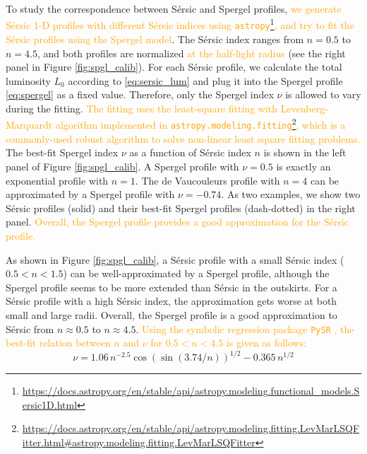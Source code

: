 \documentclass[twocolumn,astrosymb,twocolappendix,linenumbers]{aastex631}
\newcommand{\emphasize}{\textcolor{orange}}
\newcommand{\code}[1]{\texttt{#1}}
\newcommand{\sersic}{S\'ersic}
\begin{document}
\begin{CJK*}{UTF8}{gbsn}
To study the correspondence between \sersic{} and Spergel profiles, \emphasize{we generate \sersic{} 1-D profiles with different \sersic{} indices using \code{astropy}\footnote{\url{https://docs.astropy.org/en/stable/api/astropy.modeling.functional_models.Sersic1D.html}}, and try to fit the \sersic{} profiles using the Spergel model}. The \sersic{} index ranges from $n=0.5$ to $n=4.5$, and both profiles are normalized \emphasize{at the half-light radius} (see the right panel in Figure \ref{fig:spgl_calib}). For each \sersic{} profile, we calculate the total luminosity $L_0$ according to \eqref{eq:sersic_lum} and plug it into the Spergel profile \eqref{eq:spergel} as a fixed value. Therefore, only the Spergel index $\nu$ is allowed to vary during the fitting. \emphasize{The fitting uses the least-square fitting with Levenberg-Marquardt algorithm implemented in \code{astropy.modeling.fitting}\footnote{\url{https://docs.astropy.org/en/stable/api/astropy.modeling.fitting.LevMarLSQFitter.html\#astropy.modeling.fitting.LevMarLSQFitter}}, which is a commonly-used robust algorithm to solve non-linear least square fitting problems.} The best-fit Spergel index $\nu$ as a function of \sersic{} index $n$ is shown in the left panel of Figure \ref{fig:spgl_calib}. A Spergel profile with $\nu=0.5$ is exactly an exponential profile with $n=1$. The de Vaucouleurs profile \citep{deVaucouleurs1948} with $n=4$ can be approximated by a Spergel profile with $\nu=-0.74$. As two examples, we show two \sersic{} profiles (solid) and their best-fit Spergel profiles (dash-dotted) in the right panel. \emphasize{Overall, the Spergel profile provides a good approximation for the \sersic{} profile. }

As shown in Figure \ref{fig:spgl_calib}, a \sersic{} profile with a small \sersic{} index ($0.5 < n < 1.5$) can be well-approximated by a Spergel profile, although the Spergel profile seems to be more extended than \sersic{} in the outskirts. For a \sersic{} profile with a high \sersic{} index, the approximation gets worse at both small and large radii. Overall, the Spergel profile is a good approximation to \sersic{} from $n\approx 0.5$ to $n\approx 4.5$. \emphasize{Using the symbolic regression package \code{PySR} \citep{Cranmer2023}, the best-fit relation between $n$ and $\nu$ for $0.5<n<4.5$ is given as follows:}
\begin{equation}\label{eq:symbolic}
    \nu = 1.06\,n^{-2.5} \cos(\sin(3.74/n))^{1/2} - 0.365\,n^{1/2}
\end{equation}


\end{CJK*}
\end{document}

